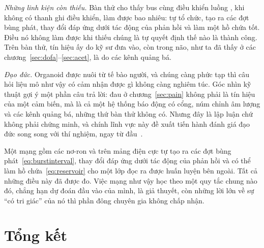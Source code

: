 \emph{Những linh kiện còn thiếu.} Bàn thử cho thấy bus  cùng điều khiển luồng , khi không có thanh ghi điều khiển, làm được bao nhiêu: tự tổ chức, tạo ra các đợt bùng phát, thay đổi đáp ứng dưới tác động của phản hồi và làm một hồ chứa tốt. Điều nó không làm được khi thiếu chúng là tự quyết định thế nào là thành công. Trên bàn thử, tín hiệu ấy do kỹ sư đưa vào, còn trong não, như ta đã thấy ở các chương~\ref{sec:dofa}--\ref{sec:acet}, là do các kênh quảng bá.

\emph{Đạo đức.} Organoid được nuôi từ tế bào người, và chúng càng phức tạp thì câu hỏi liệu mô như vậy có cảm nhận được gì không càng nghiêm túc. Góc nhìn kỹ thuật gợi ý một phần câu trả lời: đau ở chương~\ref{sec:pain} không phải là tín hiệu của một cảm biến, mà là cả một hệ thống báo động có cổng, núm chỉnh âm lượng và các kênh quảng bá, những thứ bàn thử không có. Nhưng đây là lập luận chứ không phải chứng minh, và chính lĩnh vực này đề xuất tiến hành đánh giá đạo đức song song với thí nghiệm, ngay từ đầu~\cite{Smirnova2023}.

\begin{keyblock}
\begin{proposition}
\label{prop:livingmachine}
Một mạng gồm các nơ-ron  và  trên mảng điện cực tự tạo ra các đợt bùng phát~\eqref{eq:burstinterval}, thay đổi đáp ứng dưới tác động của phản hồi và có thể làm hồ chứa~\eqref{eq:reservoir} cho một lớp đọc ra được huấn luyện bên ngoài. Tất cả những điều này đã được đo. Việc mạng như vậy học theo một quy tắc chung nào đó, chẳng hạn dự đoán đầu vào của mình, là giả thuyết, còn những lời lớn về sự ``có tri giác'' của nó thì phần đông chuyên gia không chấp nhận.
\end{proposition}
\end{keyblock}



\section{Tổng kết}


